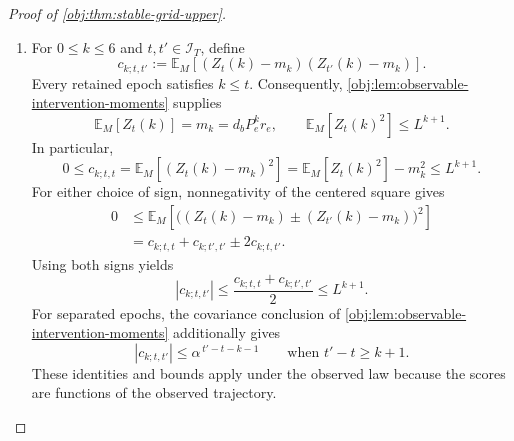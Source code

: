 \documentclass[11pt]{article}
\begin{document}
\begin{proof}[Proof of \cref{obj:thm:stable-grid-upper}]
\begin{enumerate}
\item For \(0\le k\le6\) and \(t,t'\in\mathcal I_T\), define
\[
c_{k;t,t'}
:=
\mathbb E_M\!\left[
  (Z_t(k)-m_k)(Z_{t'}(k)-m_k)
\right].
\]
Every retained epoch satisfies \(k\le t\). Consequently, \cref{obj:lem:observable-intervention-moments} supplies
\[
\mathbb E_M[Z_t(k)]=m_k=d_bP_e^kr_e,
\qquad
\mathbb E_M[Z_t(k)^2]\le L^{k+1}.
\]
In particular,
\[
0\le c_{k;t,t}
=
\mathbb E_M[(Z_t(k)-m_k)^2]
=
\mathbb E_M[Z_t(k)^2]-m_k^2
\le L^{k+1}.
\]
For either choice of sign, nonnegativity of the centered square gives
\[
\begin{aligned}
0
&\le
\mathbb E_M\!\left[
 \bigl((Z_t(k)-m_k)\pm(Z_{t'}(k)-m_k)\bigr)^2
\right]\\
&=
c_{k;t,t}+c_{k;t',t'}\pm2c_{k;t,t'}.
\end{aligned}
\]
Using both signs yields
\[
|c_{k;t,t'}|
\le
\frac{c_{k;t,t}+c_{k;t',t'}}2
\le L^{k+1}.
\]
For separated epochs, the covariance conclusion of
\cref{obj:lem:observable-intervention-moments} additionally gives
\[
|c_{k;t,t'}|
\le\alpha^{\,t'-t-k-1}
\qquad\text{when }t'-t\ge k+1.
\]
These identities and bounds apply under the observed law because the scores are functions of the observed trajectory.


\end{enumerate}
\end{proof}
\end{document}
